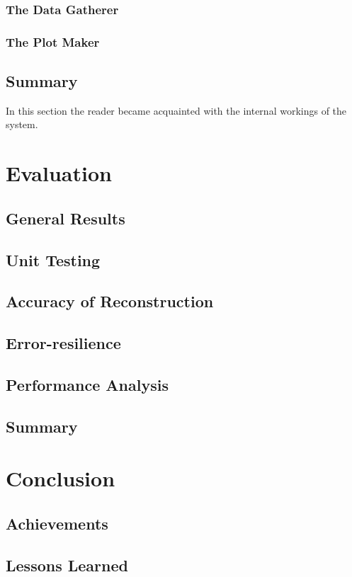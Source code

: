 \documentclass[12pt,a4paper,twoside,openright]{report}
\begin{document}
\subsection{The Data Gatherer}
\subsection{The Plot Maker}

\section{Summary} 
In this section the reader became  acquainted with the internal workings of the system.  


\chapter{Evaluation}
\section{General Results}
\section{Unit Testing}
\section{Accuracy of Reconstruction}
\section{Error-resilience}
\section{Performance Analysis}
\section{Summary}

\chapter{Conclusion}
\section{Achievements}
\section{Lessons Learned}
\end{document}
